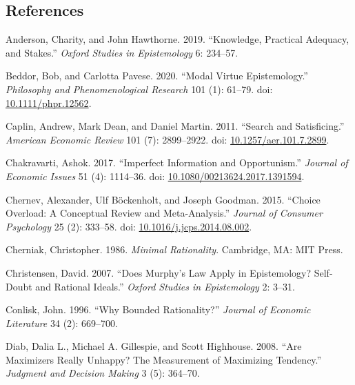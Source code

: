 \documentclass[
  10pt,
  letterpaper,
  DIV=11,
  numbers=noendperiod,
  twoside]{scrartcl}
\newlength{\cslhangindent}
\newenvironment{CSLReferences}[2] %
 {\begin{list}{}{%
  \setlength{\itemindent}{0pt}
  \setlength{\leftmargin}{0pt}
  \setlength{\parsep}{0pt}
  \ifodd #1
   \setlength{\leftmargin}{\cslhangindent}
   \setlength{\itemindent}{-1\cslhangindent}
  \fi
  \setlength{\itemsep}{#2\baselineskip}}}
 {\end{list}}
\begin{document}
\subsection*{References}\label{references}

\label{refs}
\begin{CSLReferences}{1}{0}
Anderson, Charity, and John Hawthorne. 2019. {``Knowledge, Practical
Adequacy, and Stakes.''} \emph{Oxford Studies in Epistemology} 6:
234--57.

Beddor, Bob, and Carlotta Pavese. 2020. {``Modal Virtue Epistemology.''}
\emph{Philosophy and Phenomenological Research} 101 (1): 61--79. doi:
\href{https://doi.org/10.1111/phpr.12562}{10.1111/phpr.12562}.

Caplin, Andrew, Mark Dean, and Daniel Martin. 2011. {``Search and
Satisficing.''} \emph{American Economic Review} 101 (7): 2899--2922.
doi:
\href{https://doi.org/10.1257/aer.101.7.2899}{10.1257/aer.101.7.2899}.

Chakravarti, Ashok. 2017. {``Imperfect Information and Opportunism.''}
\emph{Journal of Economic Issues} 51 (4): 1114--36. doi:
\href{https://doi.org/10.1080/00213624.2017.1391594}{10.1080/00213624.2017.1391594}.

Chernev, Alexander, Ulf Böckenholt, and Joseph Goodman. 2015. {``Choice
Overload: A Conceptual Review and Meta-Analysis.''} \emph{Journal of
Consumer Psychology} 25 (2): 333--58. doi:
\href{https://doi.org/10.1016/j.jcps.2014.08.002}{10.1016/j.jcps.2014.08.002}.

Cherniak, Christopher. 1986. \emph{Minimal Rationality}. Cambridge, MA:
MIT Press.

Christensen, David. 2007. {``Does Murphy's Law Apply in Epistemology?
Self-Doubt and Rational Ideals.''} \emph{Oxford Studies in Epistemology}
2: 3--31.

Conlisk, John. 1996. {``Why Bounded Rationality?''} \emph{Journal of
Economic Literature} 34 (2): 669--700.

Diab, Dalia L., Michael A. Gillespie, and Scott Highhouse. 2008. {``Are
Maximizers Really Unhappy? The Measurement of Maximizing Tendency.''}
\emph{Judgment and Decision Making} 3 (5): 364--70.


\end{CSLReferences}
\end{document}
